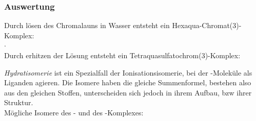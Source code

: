 \documentclass{scrartcl}
\begin{document}
\subsubsection{Auswertung}
Durch lösen des Chromalauns in Wasser entsteht ein Hexaqua-Chromat(3)-Komplex:\\ 
 $\cdot$  \\
Durch erhitzen der Lösung entsteht ein Tetraquasulfatochrom(3)-Komplex:\\ 

\emph{Hydratisomerie} ist ein Spezialfall der Ionisationsisomerie, bei der -Moleküle als Liganden agieren. Die Isomere haben die gleiche Summenformel, bestehen also aus den gleichen Stoffen, unterscheiden sich jedoch in ihrem Aufbau, bzw ihrer Struktur. \\
Mögliche Isomere des \ch{[CrCl2(H2O)4]^+}- und des \ch{[CrCl3(H2O)3]}-Komplexes:
\end{document}
